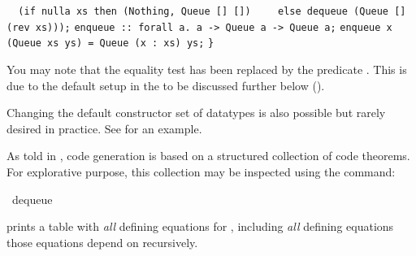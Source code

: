 \begin{isabellebody}
\begin{isamarkuptext}
\verb|  (if nulla xs then (Nothing, Queue [] [])|\newline%
\verb|    else dequeue (Queue [] (rev xs)));|\newline%
\newline%
\verb|enqueue :: forall a. a -> Queue a -> Queue a;|\newline%
\verb|enqueue x (Queue xs ys) = Queue (x : xs) ys;|\newline%
\newline%
\verb|}|%
\end{isamarkuptext}%
\isamarkuptrue%
%
\endisatagquoteme
{\isafoldquoteme}%
%
\isadelimquoteme
%
\endisadelimquoteme
%
\begin{isamarkuptext}%
\noindent You may note that the equality test  has been
  replaced by the predicate .  This is due to the default
  setup in the  to be discussed further below ().

  Changing the default constructor set of datatypes is also
  possible but rarely desired in practice.  See  for an example.

  As told in , code generation is based
  on a structured collection of code theorems.
  For explorative purpose, this collection
  may be inspected using the \hyperlink{command.code-thms}{\mbox{}} command:%
\end{isamarkuptext}%
\isamarkuptrue%
%
\isadelimquoteme
%
\endisadelimquoteme
%
\isatagquoteme
{}\isamarkupfalse%
\ dequeue%
\endisatagquoteme
{\isafoldquoteme}%
%
\isadelimquoteme
%
\endisadelimquoteme
%
\begin{isamarkuptext}%
\noindent prints a table with \emph{all} defining equations
  for , including
  \emph{all} defining equations those equations depend
  on recursively.
  

\end{isamarkuptext}
\end{isabellebody}
